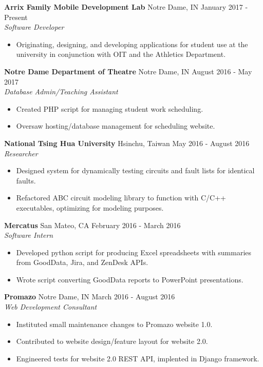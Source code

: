 \documentclass[10pt]{article}
\begin{document}
    \textbf{Arrix Family Mobile Development Lab}
    \hfill
    Notre Dame, IN
    \hfill
    January 2017 - Present
    \\
    \textit{Software Developer}
    \begin{itemize}
      \item Originating, designing, and developing applications for student use at the university in conjunction with OIT and the Athletics Department.
    \end{itemize}
    
    \textbf{Notre Dame Department of Theatre}
    \hfill
    Notre Dame, IN  
    \hfill
    August 2016 - May 2017
    \\
    \textit{Database Admin/Teaching Assistant}
    \begin{itemize}
      \item Created PHP script for managing student work scheduling.
      \item Oversaw hosting/database management for scheduling website.
    \end{itemize}
    
    \textbf{National Tsing Hua University}
    \hfill
    Hsinchu, Taiwan
    \hfill
    May 2016 - August 2016
    \\
    \textit{Researcher}
    \begin{itemize}
      \item Designed system for dynamically testing circuits and fault lists for identical faults.
      \item Refactored ABC circuit modeling library to function with C/C++ executables, optimizing for modeling purposes.
    \end{itemize}
    
    \textbf{Mercatus}
    \hfill
    San Mateo, CA
    \hfill
    February 2016 - March 2016
    \\
    \textit{Software Intern}
    \begin{itemize}
      \item Developed python script for producing Excel spreadsheets with summaries from GoodData, Jira, and ZenDesk APIs.
      \item Wrote script converting GoodData reports to PowerPoint presentations.
    \end{itemize}
    
    \textbf{Promazo}
    \hfill
    Notre Dame, IN
    \hfill
    March 2016 - August 2016
    \\
    \textit{Web Development Consultant}
    \begin{itemize}
      \item Instituted small maintenance changes to Promazo website 1.0.
      \item Contributed to website design/feature layout for website 2.0.
      \item Engineered tests for website 2.0 REST API, implented in Django framework.
    \end{itemize}
  
\end{document}
